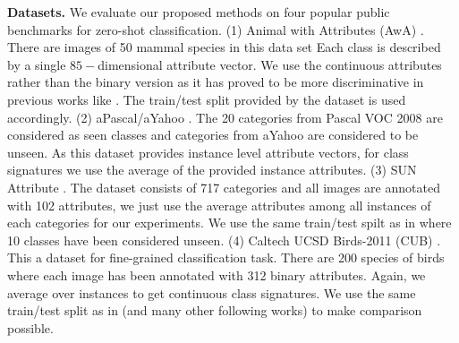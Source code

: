 \documentclass[letterpaper]{article}
\begin{document}
\textbf{Datasets.}
We evaluate our proposed methods on four popular public benchmarks for zero-shot classification.
(1) Animal with Attributes (AwA) \cite{lampert09}. There are images of 50 mammal species in this data set
Each class is described by a single $85-$dimensional attribute vector. We use the continuous attributes rather than
the binary version as it has proved to be more discriminative in previous works like \cite{Akata2015}. The train/test split provided by the dataset is used accordingly.
(2) aPascal/aYahoo \cite{farhadi09}. The 20 categories from Pascal VOC 2008 \cite{pascal} are considered as seen classes and
categories from aYahoo are considered to be unseen. As this dataset provides instance level attribute vectors,
for class signatures we use the average of the provided instance attributes.
(3) SUN Attribute \cite{sun}. The dataset consists of 717 categories and all images are annotated with 102 attributes, we just
use the average attributes among all instances of each categories for our experiments. We use the same train/test spilt
as in \cite{jayaraman14} where 10 classes have been considered unseen.
(4) Caltech UCSD Birds-2011 (CUB) \cite{cub}. This a dataset for fine-grained classification task. There are 200 species of
birds where each image has been annotated with 312 binary attributes. Again, we average over instances to get continuous class signatures.
We use the same train/test split as in \cite{akata13} (and many other following works) to make comparison possible.
\end{document}
